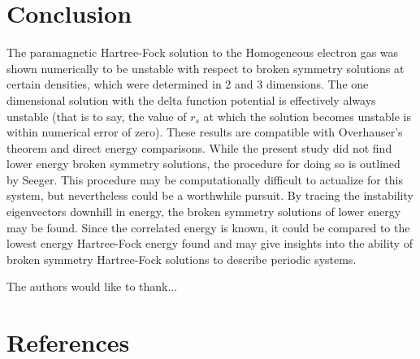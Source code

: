 \documentclass[preprint, journal=prl]{revtex4-1}
\begin{document}
  
\section{Conclusion}
  The paramagnetic Hartree-Fock solution to the Homogeneous electron gas was shown numerically to be unstable with respect to broken symmetry solutions at certain densities, which were determined in 2 and 3 dimensions. The one dimensional solution with the delta function potential is effectively always unstable (that is to say, the value of $r_s$ at which the solution becomes unstable is within numerical error of zero). These results are compatible with Overhauser's theorem and direct energy comparisons. While the present study did not find lower energy broken symmetry solutions, the procedure for doing so is outlined by Seeger\cite{Seeger1977}. This procedure may be computationally difficult to actualize for this system, but nevertheless could be a worthwhile pursuit. By tracing the instability eigenvectors downhill in energy, the broken symmetry solutions of lower energy may be found. Since the correlated energy is known, it could be compared to the lowest energy Hartree-Fock energy found and may give insights into the ability of broken symmetry Hartree-Fock solutions to describe periodic systems. 

  
\begin{acknowledgements}
The authors would like to thank...
\end{acknowledgements}

\section{References}

\end{document}
